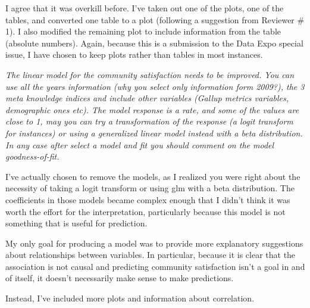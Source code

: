 \documentclass[12pt]{article}
\begin{document}
I agree that it was overkill before. I've taken out one of the plots, one of the tables, and converted one table to a plot (following a suggestion from Reviewer \# 1). I also modified the remaining plot to include information from the table (absolute numbers). Again, because this is a submission to the Data Expo special issue, I have chosen to keep plots rather than tables in most instances. 

\emph{The linear model for the community satisfaction needs to be improved. You can use all the years information (why you select only information form 2009?), the 3 meta knowledge indices and include other variables (Gallup metrics variables, demographic ones etc). The model response is a rate, and some of the values are close to 1, may you can try a transformation of the response (a logit transform for instances) or using a generalized linear model instead with a beta distribution. In any case after select a model and fit you should comment on the model goodness-of-fit.}

I've actually chosen to remove the models, as I realized you were right about the necessity of taking a logit transform or using glm with a beta distribution. The coefficients in those models became complex enough that I didn't think it was worth the effort for the interpretation, particularly because this model is not something that is useful for prediction.

My only goal for producing a model was to provide more explanatory suggestions about relationships between variables. In particular, because it is clear that the association is not causal and predicting community satisfaction isn't a goal in and of itself, it doesn't necessarily make sense to make predictions. 

Instead, I've included more plots and information about correlation. 
\end{document}
